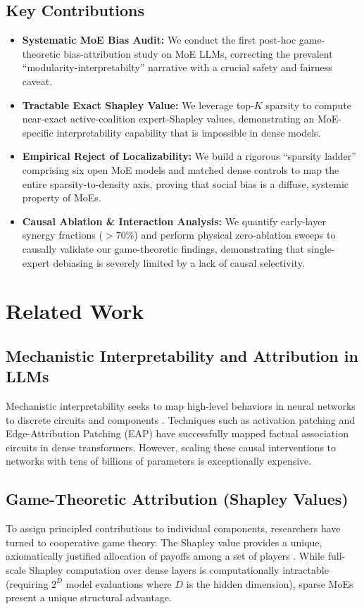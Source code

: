 \documentclass[11pt,a4paper]{article}
\begin{document}
\subsection{Key Contributions}
\begin{itemize}
    \item \textbf{Systematic MoE Bias Audit:} We conduct the first post-hoc game-theoretic bias-attribution study on MoE LLMs, correcting the prevalent ``modularity-interpretabilty'' narrative with a crucial safety and fairness caveat.
    \item \textbf{Tractable Exact Shapley Value:} We leverage top-$K$ sparsity to compute near-exact active-coalition expert-Shapley values, demonstrating an MoE-specific interpretability capability that is impossible in dense models.
    \item \textbf{Empirical Reject of Localizability:} We build a rigorous ``sparsity ladder'' comprising six open MoE models and matched dense controls to map the entire sparsity-to-density axis, proving that social bias is a diffuse, systemic property of MoEs.
    \item \textbf{Causal Ablation \& Interaction Analysis:} We quantify early-layer synergy fractions ($>70\%$) and perform physical zero-ablation sweeps to causally validate our game-theoretic findings, demonstrating that single-expert debiasing is severely limited by a lack of causal selectivity.
\end{itemize}

\section{Related Work}
\subsection{Mechanistic Interpretability and Attribution in LLMs}
Mechanistic interpretability seeks to map high-level behaviors in neural networks to discrete circuits and components \cite{dissecting_bias}. Techniques such as activation patching and Edge-Attribution Patching (EAP) have successfully mapped factual association circuits in dense transformers. However, scaling these causal interventions to networks with tens of billions of parameters is exceptionally expensive. 

\subsection{Game-Theoretic Attribution (Shapley Values)}
To assign principled contributions to individual components, researchers have turned to cooperative game theory. The Shapley value provides a unique, axiomatically justified allocation of payoffs among a set of players \cite{realexp}. While full-scale Shapley computation over dense layers is computationally intractable (requiring $2^D$ model evaluations where $D$ is the hidden dimension), sparse MoEs present a unique structural advantage. 
\end{document}
